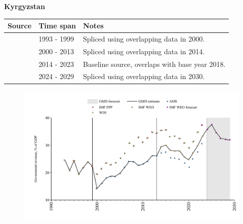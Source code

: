\documentclass[12pt,a4paper,landscape]{article}
\begin{document}
\begin{adjustbox}{max totalsize={\paperwidth}{\paperheight},center}
\begin{minipage}[t][\textheight][t]{\textwidth}
\vspace*{0.5cm}
{}
\begin{center}
{\Large\bfseries Kyrgyzstan}
\end{center}
\vspace{0.5cm}
\begin{table}[H]
\centering
\small
\begin{tabular}{|l|l|l|}
\hline
\textbf{Source} & \textbf{Time span} & \textbf{Notes} \\
\hline
\rowcolor{white}\cite{IMF_WEO}& 1993 - 1999 &Spliced using overlapping data in 2000.\\
\rowcolor{lightgray}\cite{ADB}& 2000 - 2013 &Spliced using overlapping data in 2014.\\
\rowcolor{white}\cite{WDI}& 2014 - 2023 &Baseline source, overlaps with base year 2018.\\
\rowcolor{lightgray}\cite{IMF_WEO_forecast}& 2024 - 2029 &Spliced using overlapping data in 2030.\\
\hline
\end{tabular}
\end{table}
\begin{figure}[H]
\centering
\includegraphics[width=\textwidth,height=0.6\textheight,keepaspectratio]{graphs/KGZ_govrev_GDP.pdf}
\end{figure}
\end{minipage}
\end{adjustbox}
\end{document}
